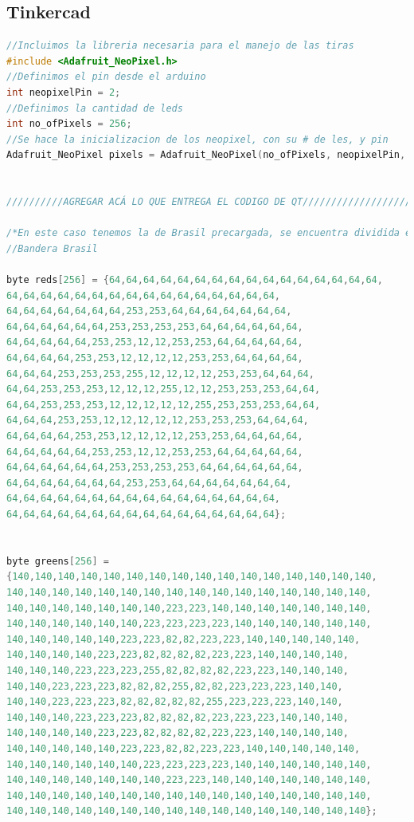 \documentclass{article}
\begin{document}
\subsection{Tinkercad}
    \begin{lstlisting}[language=C++, label=codigo_ejemplo]
//Incluimos la libreria necesaria para el manejo de las tiras
#include <Adafruit_NeoPixel.h>
//Definimos el pin desde el arduino
int neopixelPin = 2;
//Definimos la cantidad de leds
int no_ofPixels = 256;
//Se hace la inicializacion de los neopixel, con su # de les, y pin
Adafruit_NeoPixel pixels = Adafruit_NeoPixel(no_ofPixels, neopixelPin, NEO_GRB + NEO_KHZ800);


//////////AGREGAR ACÁ LO QUE ENTREGA EL CODIGO DE QT////////////////////

/*En este caso tenemos la de Brasil precargada, se encuentra dividida en 3 arreglos de 256 posiciones correspondientes c/u a un led del arreglo*/
//Bandera Brasil

byte reds[256] = {64,64,64,64,64,64,64,64,64,64,64,64,64,64,64,64,
64,64,64,64,64,64,64,64,64,64,64,64,64,64,64,64,
64,64,64,64,64,64,64,253,253,64,64,64,64,64,64,64,
64,64,64,64,64,64,253,253,253,253,64,64,64,64,64,64,
64,64,64,64,64,253,253,12,12,253,253,64,64,64,64,64,
64,64,64,64,253,253,12,12,12,12,253,253,64,64,64,64,
64,64,64,253,253,253,255,12,12,12,12,253,253,64,64,64,
64,64,253,253,253,12,12,12,255,12,12,253,253,253,64,64,
64,64,253,253,253,12,12,12,12,12,255,253,253,253,64,64,
64,64,64,253,253,12,12,12,12,12,253,253,253,64,64,64,
64,64,64,64,253,253,12,12,12,12,253,253,64,64,64,64,
64,64,64,64,64,253,253,12,12,253,253,64,64,64,64,64,
64,64,64,64,64,64,253,253,253,253,64,64,64,64,64,64,
64,64,64,64,64,64,64,253,253,64,64,64,64,64,64,64,
64,64,64,64,64,64,64,64,64,64,64,64,64,64,64,64,
64,64,64,64,64,64,64,64,64,64,64,64,64,64,64,64};


byte greens[256] = 
{140,140,140,140,140,140,140,140,140,140,140,140,140,140,140,140,
140,140,140,140,140,140,140,140,140,140,140,140,140,140,140,140,
140,140,140,140,140,140,140,223,223,140,140,140,140,140,140,140,
140,140,140,140,140,140,223,223,223,223,140,140,140,140,140,140,
140,140,140,140,140,223,223,82,82,223,223,140,140,140,140,140,
140,140,140,140,223,223,82,82,82,82,223,223,140,140,140,140,
140,140,140,223,223,223,255,82,82,82,82,223,223,140,140,140,
140,140,223,223,223,82,82,82,255,82,82,223,223,223,140,140,
140,140,223,223,223,82,82,82,82,82,255,223,223,223,140,140,
140,140,140,223,223,223,82,82,82,82,223,223,223,140,140,140,
140,140,140,140,223,223,82,82,82,82,223,223,140,140,140,140,
140,140,140,140,140,223,223,82,82,223,223,140,140,140,140,140,
140,140,140,140,140,140,223,223,223,223,140,140,140,140,140,140,
140,140,140,140,140,140,140,223,223,140,140,140,140,140,140,140,
140,140,140,140,140,140,140,140,140,140,140,140,140,140,140,140,
140,140,140,140,140,140,140,140,140,140,140,140,140,140,140,140};



\end{lstlisting}
\end{document}

